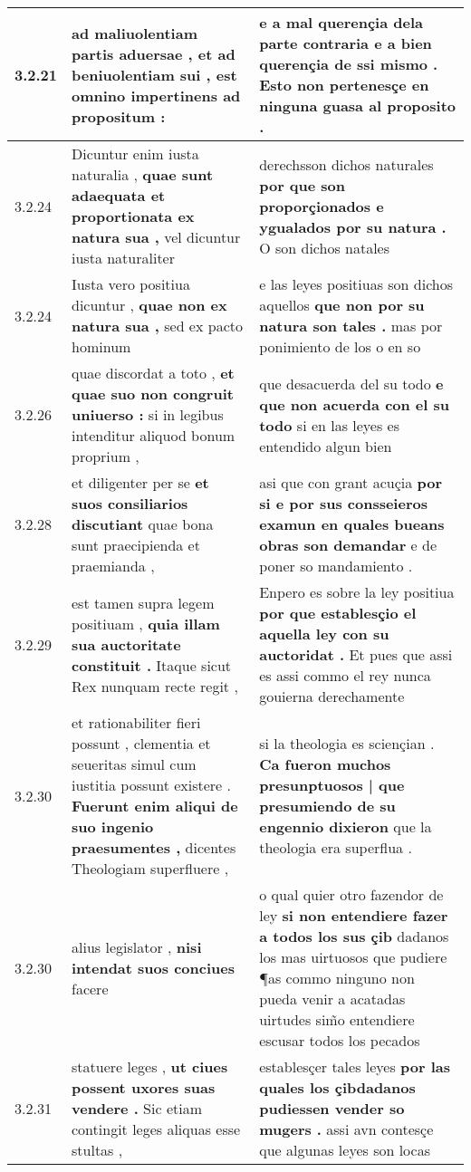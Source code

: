 \begin{tabular}{|p{1cm}|p{6.5cm}|p{6.5cm}|}
3.2.21 & ad maliuolentiam partis aduersae , \textbf{ et ad beniuolentiam sui , } est omnino impertinens ad propositum : & e a mal querençia dela parte contraria \textbf{ e a bien querençia de ssi mismo . } Esto non pertenesçe en ninguna guasa al proposito . \\\hline
3.2.24 & Dicuntur enim iusta naturalia , \textbf{ quae sunt adaequata et proportionata ex natura sua , } vel dicuntur iusta naturaliter & derechsson dichos naturales \textbf{ por que son proporçionados e ygualados por su natura . } O son dichos natales \\\hline
3.2.24 & Iusta vero positiua dicuntur , \textbf{ quae non ex natura sua , } sed ex pacto hominum & e las leyes positiuas son dichos aquellos \textbf{ que non por su natura son tales . } mas por ponimiento de los o en so \\\hline
3.2.26 & quae discordat a toto , \textbf{ et quae suo non congruit uniuerso : } si in legibus intenditur aliquod bonum proprium , & que desacuerda del su todo \textbf{ e que non acuerda con el su todo } si en las leyes es entendido algun bien \\\hline
3.2.28 & et diligenter per se \textbf{ et suos consiliarios discutiant } quae bona sunt praecipienda et praemianda , & asi que con grant acuçia \textbf{ por si e por sus consseieros examun en quales bueans obras son demandar } e de poner so mandamiento . \\\hline
3.2.29 & est tamen supra legem positiuam , \textbf{ quia illam sua auctoritate constituit . } Itaque sicut Rex nunquam recte regit , & Enpero es sobre la ley positiua \textbf{ por que establesçio el aquella ley con su auctoridat . } Et pues que assi es assi commo el rey nunca gouierna derechamente \\\hline
3.2.30 & et rationabiliter fieri possunt , clementia et seueritas simul cum iustitia possunt existere . \textbf{ Fuerunt enim aliqui de suo ingenio praesumentes , } dicentes Theologiam superfluere , & si la theologia es sciençian . \textbf{ Ca fueron muchos presunptuosos | que presumiendo de su engennio dixieron } que la theologia era superflua . \\\hline
3.2.30 & alius legislator , \textbf{ nisi intendat suos conciues } facere & o qual quier otro fazendor de ley \textbf{ si non entendiere fazer a todos los sus çib } dadanos los mas uirtuosos que pudiere ¶as commo ninguno non pueda venir a acatadas uirtudes sim̃o entendiere escusar todos los pecados \\\hline
3.2.31 & statuere leges , \textbf{ ut ciues possent uxores suas vendere . } Sic etiam contingit leges aliquas esse stultas , & establesçer tales leyes \textbf{ por las quales los çibdadanos pudiessen vender so mugers . } assi avn contesçe que algunas leyes son locas \\\hline

\end{tabular}

